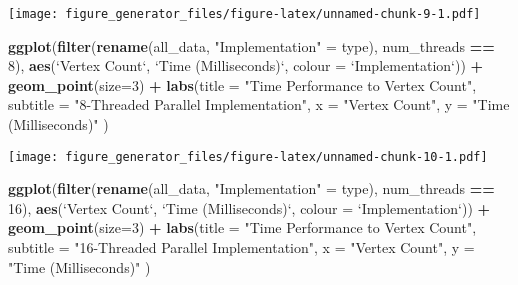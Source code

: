 \documentclass[]{article}
\newenvironment{Shaded}{\begin{snugshade}}{\end{snugshade}}
\newcommand{\KeywordTok}[1]{\textcolor[rgb]{0.13,0.29,0.53}{\textbf{#1}}}
\newcommand{\DataTypeTok}[1]{\textcolor[rgb]{0.13,0.29,0.53}{#1}}
\newcommand{\DecValTok}[1]{\textcolor[rgb]{0.00,0.00,0.81}{#1}}
\newcommand{\StringTok}[1]{\textcolor[rgb]{0.31,0.60,0.02}{#1}}
\newcommand{\OperatorTok}[1]{\textcolor[rgb]{0.81,0.36,0.00}{\textbf{#1}}}
\newcommand{\NormalTok}[1]{#1}
\begin{document}
\texttt{[image: figure\_generator\_files/figure-latex/unnamed-chunk-9-1.pdf]}

\begin{Shaded}
\begin{Highlighting}[]
\KeywordTok{ggplot}\NormalTok{(}\KeywordTok{filter}\NormalTok{(}\KeywordTok{rename}\NormalTok{(all_data, }\StringTok{"Implementation"}\NormalTok{ =}\StringTok{ }\NormalTok{type), num_threads }\OperatorTok{==}\StringTok{ }\DecValTok{8}\NormalTok{), }
              \KeywordTok{aes}\NormalTok{(}\StringTok{`}\DataTypeTok{Vertex Count}\StringTok{`}\NormalTok{, }\StringTok{`}\DataTypeTok{Time (Milliseconds)}\StringTok{`}\NormalTok{, }\DataTypeTok{colour =} \StringTok{`}\DataTypeTok{Implementation}\StringTok{`}\NormalTok{)) }\OperatorTok{+}\StringTok{ }
\StringTok{  }\KeywordTok{geom_point}\NormalTok{(}\DataTypeTok{size=}\DecValTok{3}\NormalTok{) }\OperatorTok{+}
\StringTok{  }\KeywordTok{labs}\NormalTok{(}\DataTypeTok{title =} \StringTok{"Time Performance to Vertex Count"}\NormalTok{,}
         \DataTypeTok{subtitle =} \StringTok{"8-Threaded Parallel Implementation"}\NormalTok{,}
         \DataTypeTok{x =} \StringTok{"Vertex Count"}\NormalTok{,}
         \DataTypeTok{y =} \StringTok{"Time (Milliseconds)"}
\NormalTok{        ) }
\end{Highlighting}
\end{Shaded}

\texttt{[image: figure\_generator\_files/figure-latex/unnamed-chunk-10-1.pdf]}

\begin{Shaded}
\begin{Highlighting}[]
\KeywordTok{ggplot}\NormalTok{(}\KeywordTok{filter}\NormalTok{(}\KeywordTok{rename}\NormalTok{(all_data, }\StringTok{"Implementation"}\NormalTok{ =}\StringTok{ }\NormalTok{type), num_threads }\OperatorTok{==}\StringTok{ }\DecValTok{16}\NormalTok{), }
              \KeywordTok{aes}\NormalTok{(}\StringTok{`}\DataTypeTok{Vertex Count}\StringTok{`}\NormalTok{, }\StringTok{`}\DataTypeTok{Time (Milliseconds)}\StringTok{`}\NormalTok{, }\DataTypeTok{colour =} \StringTok{`}\DataTypeTok{Implementation}\StringTok{`}\NormalTok{)) }\OperatorTok{+}\StringTok{ }
\StringTok{  }\KeywordTok{geom_point}\NormalTok{(}\DataTypeTok{size=}\DecValTok{3}\NormalTok{) }\OperatorTok{+}
\StringTok{  }\KeywordTok{labs}\NormalTok{(}\DataTypeTok{title =} \StringTok{"Time Performance to Vertex Count"}\NormalTok{,}
         \DataTypeTok{subtitle =} \StringTok{"16-Threaded Parallel Implementation"}\NormalTok{,}
         \DataTypeTok{x =} \StringTok{"Vertex Count"}\NormalTok{,}
         \DataTypeTok{y =} \StringTok{"Time (Milliseconds)"}
\NormalTok{        ) }
\end{Highlighting}
\end{Shaded}
\end{document}
